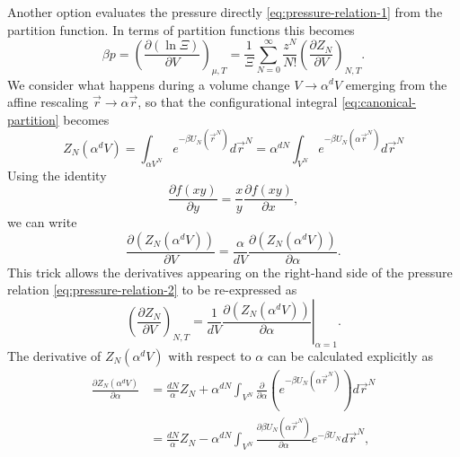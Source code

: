 Another option evaluates the pressure directly \eqref{eq:pressure-relation-1} from the partition function.
In terms of partition functions this becomes
\begin{equation}\label{eq:pressure-relation-2}
  \beta p
  =
  \left( \frac{\partial (\ln{\Xi})}{\partial V} \right)_{\mu,T}
  =
  \frac{1}{\Xi} \sum_{N=0}^\infty \frac{z^N}{N!}
  \left( \frac{\partial Z_N}{\partial V} \right)_{N,T}.
\end{equation}
We consider what happens during a volume change $V \to \alpha^d V$ emerging from the affine rescaling $\vec{r} \to \alpha \vec{r}$, so that the configurational integral \eqref{eq:canonical-partition} becomes
\begin{equation*}
  Z_N(\alpha^d V)
  =
  \int_{\alpha V^N} e^{-\beta U_N(\vec{r}^N)} d\vec{r}^N
  =
  \alpha^{dN}
  \int_{V^N} e^{-\beta U_N(\alpha \vec{r}^N)} d\vec{r}^N
\end{equation*}
Using the identity
\begin{equation*}
  \frac{\partial f(xy)}{\partial y}
  =
  \frac{x}{y} \frac{\partial f(xy)}{\partial x},
\end{equation*}
we can write
\begin{equation}\label{eq:inflated-canonical-Z-derivative}
  \frac{\partial (Z_N(\alpha^d V))}{\partial V}
  =
  \frac{\alpha}{d V}
  \frac{\partial (Z_N(\alpha^d V))}{\partial \alpha}.
\end{equation}
This trick allows the derivatives appearing on the right-hand side of the pressure relation \eqref{eq:pressure-relation-2} to be re-expressed as
\begin{equation*}
  \left( \frac{\partial Z_N}{\partial V} \right)_{N,T}
  =
  \frac{1}{d V}
  \left.
  \frac{\partial (Z_N(\alpha^d V))}{\partial \alpha}
  \right|_{\alpha = 1}.
\end{equation*}
The derivative of $Z_N(\alpha^d V)$  with respect to $\alpha$ can be calculated explicitly as
\begin{equation*}
  \begin{split}
    \frac{\partial Z_N(\alpha^d V)}{\partial \alpha}
    &=
    \frac{dN}{\alpha} Z_N
    +
    \alpha^{dN}
    \int_{V^N}
    \frac{\partial}{\partial \alpha}
    \left( e^{-\beta U_N(\alpha \vec{r}^N)} \right)
    d\vec{r}^N
    \\ &=
    \frac{dN}{\alpha} Z_N
    -
    \alpha^{dN}
    \int_{V^N}
    \frac{\partial \beta U_N(\alpha \vec{r}^N)}{\partial \alpha}
    e^{-\beta U_N}
    d\vec{r}^N,
  \end{split}
\end{equation*}
